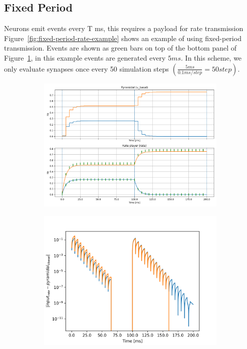 \documentclass{article}
\begin{document}
\subsection{Fixed Period}
Neurons emit events every T ms, this requires a payload for rate transmission \\

Figure~\ref{fig:fixed-period-rate-example} shows an example of using fixed-period transmission. 
Events are shown as green bars on top of the bottom panel of Figure~\ref{fig:fixed-period-transmission}, in this example events are generated every $5 ms$. 
In this scheme, we only evaluate synapses once every 50 simulation steps $\left(\frac{5 ms}{0.1 ms/step} = 50 step\right)$.



\begin{figure}[h!bt]
    \centering
    \begin{subfigure}[b]{0.6\textwidth}
        \centering 
        \includegraphics[width=\textwidth]{fixed_period_5_rate_player_plus_pyramid_behaviour.png}
        \caption{}
        \label{fig:fixed-period-transmission}
    \end{subfigure}
    \hfill
    \begin{subfigure}[b]{0.35\textwidth}
        \centering
        \includegraphics[width=\textwidth]{fixed_period_5_rate_differences.png}

\end{subfigure}
\end{figure}
\end{document}
